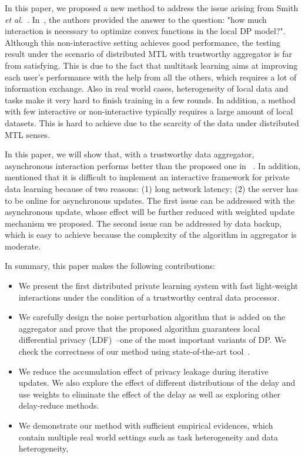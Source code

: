 In this paper, we proposed a new method to address the issue arising from Smith {\it et al.}~\cite{smith2017interaction}. In~\cite{smith2017interaction}, the authors provided the answer to the question: "how much interaction is necessary to optimize convex functions in the local DP model?". Although this non-interactive setting achieves good performance, the testing result under the scenario of distributed MTL with trustworthy aggregator is far from satisfying. This is due to the fact that multitask learning aims at improving each user's performance with the help from all the others, which requires a lot of information exchange. Also in real world cases, heterogeneity of local data and tasks make it very hard to finish training in a few rounds. In addition, a method with few interactive or non-interactive typically requires a large amount of local datasets. This is hard to achieve due to the scarcity of the data under distributed MTL senses. 

In this paper, we will show that, with a trustworthy data aggregator, asynchronous interaction performs better than the proposed one in~\cite{smith2017interaction} . In addition, \cite{smith2017interaction} mentioned that it is difficult to implement an interactive framework for private data learning because of two reasons: (1) long network latency; (2) the server has to be online for asynchronous updates. The first issue can be addressed with the asynchronous update, whose effect will be further reduced with weighted update mechanism we proposed. The second issue can be addressed by data backup, which is easy to achieve because the complexity of the algorithm in aggregator is moderate.

In summary, this paper makes the following contributions:
\begin{itemize}
  \item We present the first distributed private learning system with fast light-weight interactions under the condition of a trustworthy central data processor.
  \item We carefully design the noise perturbation algorithm that is added on the aggregator and prove that the proposed algorithm guarantees local differential privacy (LDF)~\cite{duchi2013local}--one of the most important variants of DP. We check the correctness of our method using state-of-the-art tool~\cite{ding2018toward}.
  \item We reduce the accumulation effect of privacy leakage during iterative updates. We also explore the effect of different distributions of the delay and use weights to eliminate the effect of the delay as well as exploring other delay-reduce methods.
  \item We demonstrate our method with sufficient empirical evidences, which contain multiple real world settings such as task heterogeneity and data heterogeneity, 
\end{itemize}

